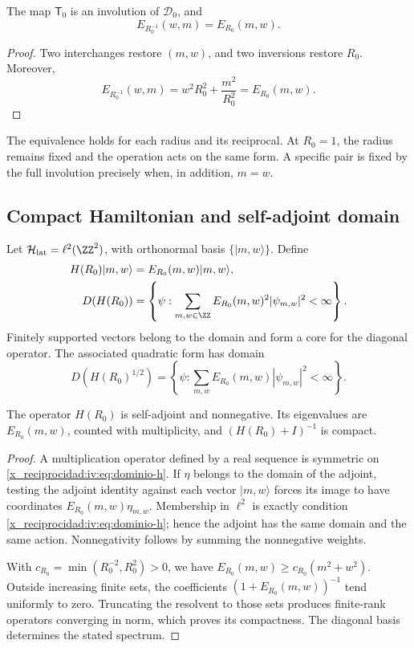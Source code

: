 \begin{theorem}
\label{x_reciprocidad:iv:thm:dualidad-escalar}
The map \(\mathsf T_0\) is an involution of
\(\mathscr D_0\), and
\[
 E_{R_0^{-1}}(w,m)=E_{R_0}(m,w).
\]
\end{theorem}
\begin{proof}
Two interchanges restore \((m,w)\), and two inversions restore
\(R_0\). Moreover,
\[
 E_{R_0^{-1}}(w,m)=w^2R_0^2+\frac{m^2}{R_0^2}
 =E_{R_0}(m,w).
\]
\end{proof}

The equivalence holds for each radius and its reciprocal. At \(R_0=1\),
the radius remains fixed and the operation acts on the same form.
A specific pair is fixed by the full involution precisely
when, in addition, \(m=w\).

\subsection{Compact Hamiltonian and self-adjoint domain}

Let \(\mathcal H_{\mathrm{lat}}=\ell^2(\ZZ^2)\), with
orthonormal basis \(\{|m,w\rangle\}\). Define
\begin{align}
 H(R_0)|m,w\rangle&=E_{R_0}(m,w)|m,w\rangle,\label{x_reciprocidad:iv:eq:hamiltoniano}\\
 D(H(R_0))&=\left\{\psi:\sum_{m,w\in\ZZ}
 E_{R_0}(m,w)^2|\psi_{m,w}|^2<\infty\right\}.\label{x_reciprocidad:iv:eq:dominio-h}
\end{align}
Finitely supported vectors belong to the domain and form a
core for the diagonal operator. The associated quadratic form has
domain
\[
 D(H(R_0)^{1/2})=\left\{\psi:\sum_{m,w}
 E_{R_0}(m,w)|\psi_{m,w}|^2<\infty\right\}.
\]

\begin{proposition}
\label{x_reciprocidad:iv:prop:h-autoadjunto}
The operator \(H(R_0)\) is self-adjoint and nonnegative. Its
eigenvalues are \(E_{R_0}(m,w)\), counted with multiplicity,
and \((H(R_0)+I)^{-1}\) is compact.
\end{proposition}
\begin{proof}
A multiplication operator defined by a real sequence is symmetric
on \eqref{x_reciprocidad:iv:eq:dominio-h}. If \(\eta\) belongs to the domain
of the adjoint, testing the adjoint identity against each vector
\(|m,w\rangle\) forces its image to have coordinates
\(E_{R_0}(m,w)\eta_{m,w}\). Membership in
\(\ell^2\) is exactly condition \eqref{x_reciprocidad:iv:eq:dominio-h}; hence
the adjoint has the same domain and the same action. Nonnegativity
follows by summing the nonnegative weights.

With \(c_{R_0}=\min(R_0^{-2},R_0^2)>0\), we have
\(E_{R_0}(m,w)\geq c_{R_0}(m^2+w^2)\). Outside increasing
finite sets, the coefficients
\((1+E_{R_0}(m,w))^{-1}\) tend uniformly to zero.
Truncating the resolvent to those sets produces finite-rank
operators converging in norm, which proves its
compactness. The diagonal basis determines the stated spectrum.
\end{proof}

